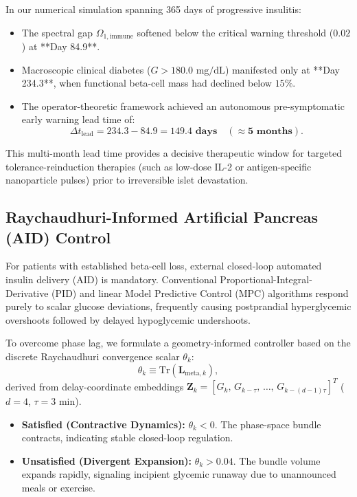\documentclass[11pt,a4paper]{article}
\begin{document}
In our numerical simulation spanning 365 days of progressive insulitis:
\begin{itemize}
    \item The spectral gap $\Omega_{1,\mathrm{immune}}$ softened below the critical warning threshold ($0.02$) at **Day 84.9**.
    \item Macroscopic clinical diabetes ($G > 180.0\text{ mg/dL}$) manifested only at **Day 234.3**, when functional beta-cell mass had declined below $15\%$.
    \item The operator-theoretic framework achieved an autonomous pre-symptomatic early warning lead time of:
    \begin{equation}
    \Delta t_{\mathrm{lead}} = 234.3 - 84.9 = \mathbf{149.4\text{ days}} \quad (\approx \mathbf{5\text{ months}}).
    \end{equation}
\end{itemize}
This multi-month lead time provides a decisive therapeutic window for targeted tolerance-reinduction therapies (such as low-dose IL-2 or antigen-specific nanoparticle pulses) prior to irreversible islet devastation.

\subsection{Raychaudhuri-Informed Artificial Pancreas (AID) Control}

For patients with established beta-cell loss, external closed-loop automated insulin delivery (AID) is mandatory. Conventional Proportional-Integral-Derivative (PID) and linear Model Predictive Control (MPC) algorithms respond purely to scalar glucose deviations, frequently causing postprandial hyperglycemic overshoots followed by delayed hypoglycemic undershoots.

To overcome phase lag, we formulate a geometry-informed controller based on the discrete Raychaudhuri convergence scalar $\theta_k$:
\begin{equation}
\theta_k \equiv \mathrm{Tr}\left( \bm{L}_{\mathrm{meta}, k} \right),
\end{equation}
derived from delay-coordinate embeddings $\bm{Z}_k = [G_k, \, G_{k-\tau}, \, \dots, \, G_{k-(d-1)\tau}]^T$ ($d = 4$, $\tau = 3\text{ min}$).
\begin{itemize}
    \item \textbf{Satisfied (Contractive Dynamics):} $\theta_k < 0$. The phase-space bundle contracts, indicating stable closed-loop regulation.
    \item \textbf{Unsatisfied (Divergent Expansion):} $\theta_k > 0.04$. The bundle volume expands rapidly, signaling incipient glycemic runaway due to unannounced meals or exercise.
\end{itemize}
\end{document}
